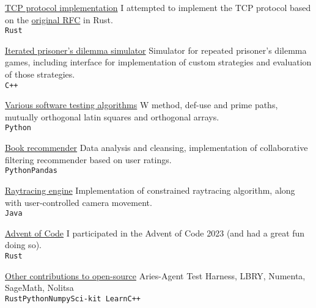 \documentclass[9pt]{developercv} %
\begin{document}
\begin{entrylist}
	\entry
		{}
		{\href{https://github.com/mirgee/tcp}{TCP protocol implementation}}
		{}
    {I attempted to implement the TCP protocol based on the \href{https://www.rfc-editor.org/rfc/rfc793}{original RFC} in Rust.\\
         \texttt{Rust}}

	\entry
		{}
		{\href{https://github.com/mirgee/iterated_prisoner-s_dilemma}{Iterated prisoner's dilemma simulator}}
		{}
		{Simulator for repeated prisoner's dilemma games, including interface for implementation of custom strategies and evaluation of those strategies.
          \\\texttt{C++}
        }

	\entry
		{}
		{\href{https://github.com/mirgee/w_method}{Various software testing algorithms}}
		{}
		{W method, def-use and prime paths, mutually orthogonal latin squares and orthogonal arrays.
         \\\texttt{Python}
        }

	\entry
		{}
		{\href{https://github.com/mirgee/book_recommender}{Book recommender}}
		{}
		{Data analysis and cleansing, implementation of collaborative filtering recommender based on user ratings.
         \\\texttt{Python}\slashsep\texttt{Pandas}
        }

	\entry
		{}
		{\href{https://github.com/mirgee/raytracing_engine}{Raytracing engine}}
		{}
		{Implementation of constrained raytracing algorithm, along with user-controlled camera movement.
         \\\texttt{Java}
        }

	\entry
		{}
		{\href{https://github.com/mirgee/advent-of-code}{Advent of Code}}
		{}
    {I participated in the Advent of Code 2023 (and had a great fun doing so).\\
         \texttt{Rust}}

	\entry
		{}
		{\href{}{Other contributions to open-source}}
		{}
		{Aries-Agent Test Harness, LBRY, Numenta, SageMath, Nolitsa\\
         \texttt{Rust}\slashsep\texttt{Python}\slashsep\texttt{Numpy}\slashsep\texttt{Sci-kit Learn}\slashsep\texttt{C++}
        }
\end{entrylist}


\end{document}
